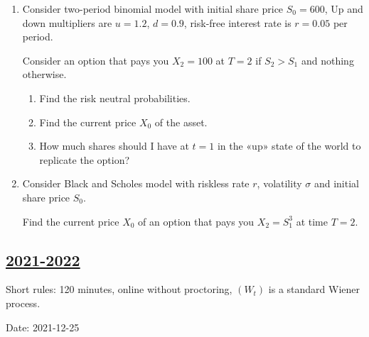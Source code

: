 \begin{enumerate}
\item Consider two-period binomial model with initial share price $S_0 = 600$, 
Up and down multipliers are $u=1.2$, $d=0.9$, risk-free interest rate is $r = 0.05$ per period. 

Consider an option that pays you $X_2 = 100$ at $T=2$ if $S_2 > S_1$ and nothing otherwise. 

\begin{enumerate}
    \item Find the risk neutral probabilities. 
    \item Find the current price $X_0$ of the asset. 
    \item How much shares should I have at $t=1$ in the «up» state of the world to replicate the option?
\end{enumerate}

\item Consider Black and Scholes model with riskless rate $r$, volatility $\sigma$ and initial share price $S_0$. 

Find the current price $X_0$ of an option that pays you $X_2 = S_1^3$ at time $T=2$. 

\end{enumerate}




\subsection[2021-2022]{\hyperref[sec:sol_kr_02_2021_2022]{2021-2022}}
\label{sec:kr_02_2021_2022} %

Short rules: 120 minutes, online without proctoring, $(W_t)$ is a standard Wiener process.

Date: 2021-12-25

